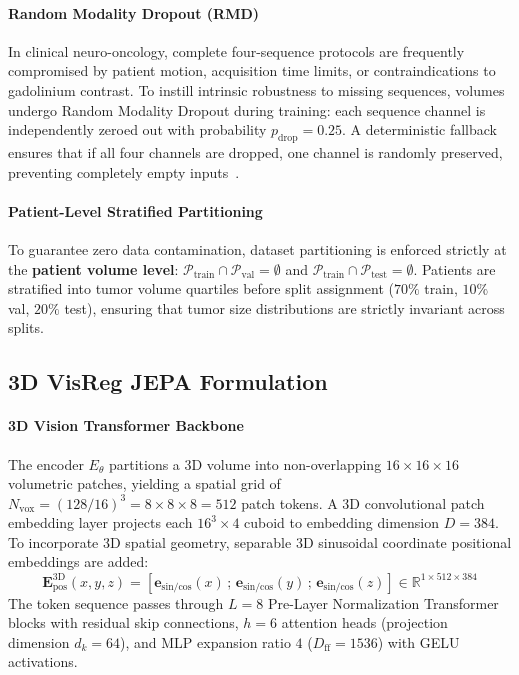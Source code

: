 \documentclass{article}
\begin{document}
\paragraph{Random Modality Dropout (RMD)}
In clinical neuro-oncology, complete four-sequence protocols are frequently compromised by patient motion, acquisition time limits, or contraindications to gadolinium contrast. To instill intrinsic robustness to missing sequences, volumes undergo Random Modality Dropout during training: each sequence channel is independently zeroed out with probability $p_{\text{drop}} = 0.25$. A deterministic fallback ensures that if all four channels are dropped, one channel is randomly preserved, preventing completely empty inputs~\citep{havaei2017brain}.

\paragraph{Patient-Level Stratified Partitioning}
To guarantee zero data contamination, dataset partitioning is enforced strictly at the \textbf{patient volume level}: $\mathcal{P}_{\text{train}} \cap \mathcal{P}_{\text{val}} = \emptyset$ and $\mathcal{P}_{\text{train}} \cap \mathcal{P}_{\text{test}} = \emptyset$. Patients are stratified into tumor volume quartiles before split assignment ($70\%$ train, $10\%$ val, $20\%$ test), ensuring that tumor size distributions are strictly invariant across splits.

\subsection{3D VisReg JEPA Formulation}
\label{sec:visreg_formulation}

\paragraph{3D Vision Transformer Backbone}
The encoder $E_\theta$ partitions a 3D volume into non-overlapping $16 \times 16 \times 16$ volumetric patches, yielding a spatial grid of $N_{\text{vox}} = (128 / 16)^3 = 8 \times 8 \times 8 = 512$ patch tokens. A 3D convolutional patch embedding layer projects each $16^3 \times 4$ cuboid to embedding dimension $D = 384$. To incorporate 3D spatial geometry, separable 3D sinusoidal coordinate positional embeddings are added:
\begin{equation}
    \mathbf{E}_{\text{pos}}^{3\text{D}}(x, y, z) = \left[ \mathbf{e}_{\text{sin/cos}}(x) \,;\, \mathbf{e}_{\text{sin/cos}}(y) \,;\, \mathbf{e}_{\text{sin/cos}}(z) \right] \in \mathbb{R}^{1 \times 512 \times 384}
\end{equation}
The token sequence passes through $L = 8$ Pre-Layer Normalization Transformer blocks with residual skip connections, $h = 6$ attention heads (projection dimension $d_k = 64$), and MLP expansion ratio $4$ ($D_{\text{ff}} = 1536$) with GELU activations.
\end{document}

